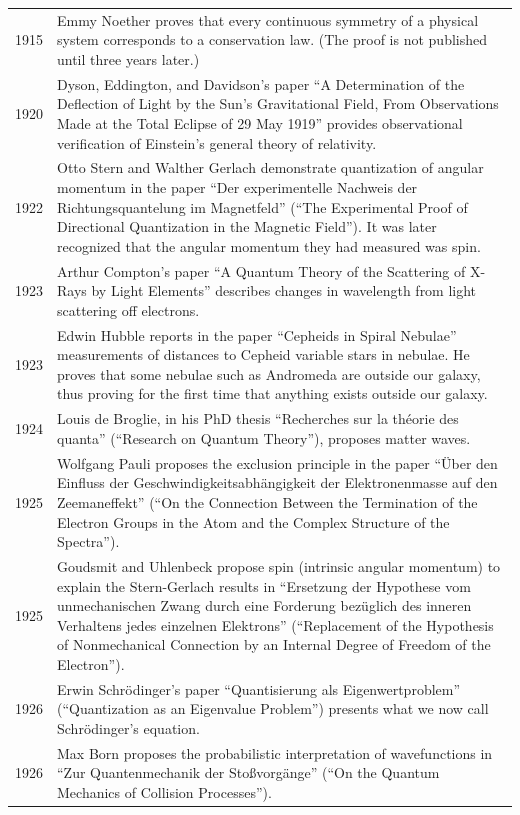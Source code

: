 \documentclass[../../../main.tex]{subfiles}
\begin{document}
\begin{center}
\begin{longtable}{p{}  p{}}
1915&Emmy Noether proves that every continuous symmetry of a physical system corresponds to a conservation law. (The proof is not published until three years later.)\\
1920&Dyson, Eddington, and Davidson's paper “A Determination of the Deflection of Light by the Sun's Gravitational Field, From Observations Made at the Total Eclipse of 29 May 1919” provides observational verification of Einstein's general theory of relativity.\\
1922&Otto Stern and Walther Gerlach demonstrate quantization of angular momentum in the paper “Der experimentelle Nachweis der Richtungsquantelung im Magnetfeld” (“The Experimental Proof of Directional Quantization in the Magnetic Field”). It was later recognized that the angular momentum they had measured was spin.\\
1923&Arthur Compton's paper “A Quantum Theory of the Scattering of X-Rays by Light Elements” describes changes in wavelength from light scattering off electrons.\\
1923&Edwin Hubble reports in the paper “Cepheids in Spiral Nebulae” measurements of distances to Cepheid variable stars in nebulae. He proves that some nebulae such as Andromeda are outside our galaxy, thus proving for the first time that anything exists outside our galaxy.\\
1924&Louis de Broglie, in his PhD thesis “Recherches sur la théorie des quanta” (“Research on Quantum Theory”), proposes matter waves.\\
1925&Wolfgang Pauli proposes the exclusion principle in the paper “Über den Einfluss der Geschwindigkeitsabhängigkeit der Elektronenmasse auf den Zeemaneffekt” (“On the Connection Between the Termination of the Electron Groups in the Atom and the Complex Structure of the Spectra”).\\
1925&Goudsmit and Uhlenbeck propose spin (intrinsic angular momentum) to explain the Stern-Gerlach results in “Ersetzung der Hypothese vom unmechanischen Zwang durch eine Forderung bezüglich des inneren Verhaltens jedes einzelnen Elektrons” (“Replacement of the Hypothesis of Nonmechanical Connection by an Internal Degree of Freedom of the Electron”).\\
1926&Erwin Schrödinger's paper “Quantisierung als Eigenwertproblem” (“Quantization as an Eigenvalue Problem”) presents what we now call Schrödinger's equation.\\
1926&Max Born proposes the probabilistic interpretation of wavefunctions in “Zur Quantenmechanik der Stoßvorgänge” (“On the Quantum Mechanics of Collision Processes”).\\

\end{longtable}
\end{center}
\end{document}

